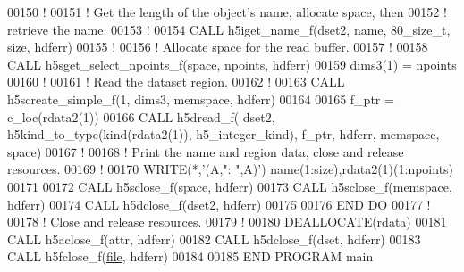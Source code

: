 \begin{DoxyCode}
00150      \textcolor{comment}{!}
00151      \textcolor{comment}{! Get the length of the object's name, allocate space, then}
00152      \textcolor{comment}{! retrieve the name.}
00153      \textcolor{comment}{!}
00154      \textcolor{keyword}{CALL }h5iget\_name\_f(dset2, name, 80\_size\_t, \textcolor{keyword}{size}, hdferr)
00155      \textcolor{comment}{!}
00156      \textcolor{comment}{! Allocate space for the read buffer.}
00157      \textcolor{comment}{!}
00158      \textcolor{keyword}{CALL }h5sget\_select\_npoints\_f(space, npoints, hdferr)
00159      dims3(1) = npoints
00160      \textcolor{comment}{!}
00161      \textcolor{comment}{! Read the dataset region.}
00162      \textcolor{comment}{!}
00163      \textcolor{keyword}{CALL }h5screate\_simple\_f(1, dims3, memspace, hdferr)
00164 
00165      f\_ptr = c\_loc(rdata2(1))
00166      \textcolor{keyword}{CALL }h5dread\_f( dset2, h5kind\_to\_type(kind(rdata2(1)), h5\_integer\_kind), f\_ptr, hdferr, memspace, 
      space)
00167      \textcolor{comment}{!}
00168      \textcolor{comment}{! Print the name and region data, close and release resources.}
00169      \textcolor{comment}{!}
00170      \textcolor{keyword}{WRITE}(*,\textcolor{stringliteral}{'(A,": ",A)'}) name(1:size),rdata2(1)(1:npoints) 
00171      
00172      \textcolor{keyword}{CALL }h5sclose\_f(space, hdferr)
00173      \textcolor{keyword}{CALL }h5sclose\_f(memspace, hdferr)
00174      \textcolor{keyword}{CALL }h5dclose\_f(dset2, hdferr)
00175 
00176 \textcolor{keywordflow}{  END DO}
00177   \textcolor{comment}{!}
00178   \textcolor{comment}{! Close and release resources.}
00179   \textcolor{comment}{!}
00180   \textcolor{keyword}{DEALLOCATE}(rdata)
00181   \textcolor{keyword}{CALL }h5aclose\_f(attr, hdferr)
00182   \textcolor{keyword}{CALL }h5dclose\_f(dset, hdferr)
00183   \textcolor{keyword}{CALL }h5fclose\_f(\hyperlink{structfile}{file}, hdferr)
00184 
00185 \textcolor{keyword}{END PROGRAM }main
\end{DoxyCode}
